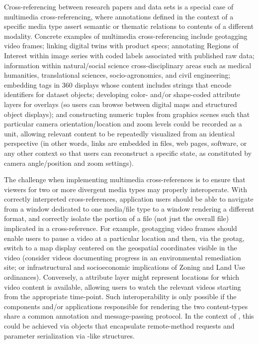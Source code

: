 \documentclass[11pt]{article}
\begin{document}
{{\begin{description}
\pseudoIndent{} Cross-referencing between research papers and data sets 
is a special case of multimedia cross-referencing, where annotations defined 
in the context of a specific media type assert semantic or thematic 
relations to contents of a different modality.  Concrete examples 
of multimedia cross-referencing include geotagging video frames; linking 
\CAD{} digital twins with product specs; annotating Regions of Interest 
within image series with coded labels associated with published raw data; 
information within natural/social science cross-disciplinary areas such as medical 
humanities, translational sciences, socio-agronomics, and civil engineering;
embedding tags in 360\textdegree{} displays whose content includes 
\URL{} strings that encode identifiers for dataset objects; developing 
color- and/or shape-coded attribute layers for \GIS{} overlays (so users 
can browse between digital maps and structured object 
displays); and constructing numeric tuples from \ThreeD{} graphics scenes 
such that particular camera orientation/location and zoom levels 
could be recorded as a unit, allowing relevant \ThreeD{} content to be 
repeatedly visualized from an identical perspective (in other words, 
links are embedded in \PDF{} files, web pages, software, or any 
other context so that users can reconstruct a specific \ThreeD{} state, 
as constituted by camera angle/position and zoom settings).

\pseudoIndent{}  The challenge when implementing multimedia cross-references is to 
ensure that viewers for two or more divergent media types may properly 
interoperate.  With correctly interpreted cross-references, application users should be able 
to navigate from a window dedicated to one media/file type to a 
window rendering a different format, and correctly isolate the 
portion of a file (not just the overall file) implicated in a cross-reference.  
For example, geotagging video frames should enable users to pause a video 
at a particular location and then, via the geotag, switch to a map 
display centered on the geospatial coordinates visible in the video 
(consider videos documenting progress in an environmental 
remediation site; or infrastructural and socioeconomic implications of 
Zoning and Land Use ordinances).  Conversely, a \GIS{} attribute layer might represent 
locations for which video content is available, allowing users 
to watch the relevant videos starting from the appropriate time-point.  
Such interoperability is only possible if the components and/or applications 
responsible for rendering the two content-types share a common 
annotation and message-passing protocol.  In the context of \PacTk{}, 
this could be achieved via \TSOM{}  objects that encapsulate 
remote-method requests and parameter serialization via 
\TagML{}-like structures.
 


\end{description}}}
\end{document}
